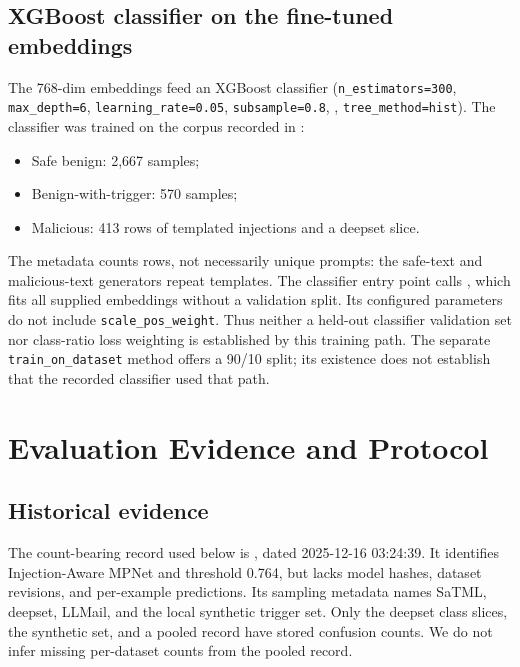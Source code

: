 \documentclass[11pt, a4paper]{article}
\begin{document}
\subsection{XGBoost classifier on the fine-tuned embeddings}

The 768-dim embeddings feed an XGBoost classifier
(\texttt{n\_estimators=300}, \texttt{max\_depth=6},
\texttt{learning\_rate=0.05}, \texttt{subsample=0.8},
, \texttt{tree\_method=hist}). The classifier
was trained on the corpus recorded in
:

\begin{itemize}
    \item Safe benign: 2{,}667 samples;
    \item Benign-with-trigger: 570 samples;
    \item Malicious: 413 rows of templated injections and a deepset slice.
\end{itemize}

The metadata counts rows, not necessarily unique prompts: the safe-text
and malicious-text generators repeat templates. The classifier entry point
calls , which fits all supplied embeddings
without a validation split. Its configured parameters do not include
\texttt{scale\_pos\_weight}. Thus neither a held-out classifier validation
set nor class-ratio loss weighting is established by this training path.
The separate \texttt{train\_on\_dataset} method offers a 90/10 split; its
existence does not establish that the recorded classifier used that path.

\section{Evaluation Evidence and Protocol}

\subsection{Historical evidence}
The count-bearing record used below is
, dated
2025-12-16 03:24:39. It identifies Injection-Aware MPNet and threshold
0.764, but lacks model hashes, dataset revisions, and per-example predictions.
Its sampling metadata names SaTML, deepset, LLMail, and the local synthetic
trigger set. Only the deepset class slices, the synthetic set, and a pooled
record have stored confusion counts. We do not infer missing per-dataset
counts from the pooled record.
\end{document}
